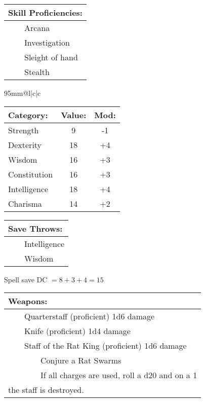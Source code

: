 \documentclass[11pt]{article}
\newcommand{\tabitem}{~~\llap{--}~~}
\newcommand{\tabtabitem}{~~~~~~\llap{$\bullet$}~~}
\begin{document}
\begin{multicols}{2}
\vspace{2mm}
		
\noindent \begin{tabularx}{95mm}{@{}l}
{\Large \textbf{Skill Proficiencies:}} \\
\hline
\tabitem Arcana \\
\tabitem Investigation \\
\tabitem Sleight of hand \\
\tabitem Stealth
		\end{tabularx}

\vspace{4mm}

\noindent \begin{tabularx}{95mm}{@{}l|c|c}
 \\
\hline
		\end{tabularx}
\noindent \begin{tabular}{@{}l|c|c}
\textbf{Category:} 			& \textbf{Value:} 	& \textbf{Mod:} \\
\hline
Strength 					& 9 				& -1 			\\
Dexterity 					& 18 				& +4 			\\
Wisdom 						& 16			 	& +3 			\\
Constitution 				& 16 				& +3 			\\
Intelligence 				& 18 				& +4 			\\
Charisma 					& 14 				& +2
		\end{tabular}

\vspace{4mm}

\noindent \begin{tabularx}{95mm}{@{}l}
{\Large \textbf{Save Throws:}} \\
\hline
\tabitem Intelligence \\
\tabitem Wisdom
		\end{tabularx}
\noindent Spell save DC $= 8 + 3 + 4 = 15$

\vspace{4mm}

\noindent \begin{tabularx}{95mm}{@{}l}
{\Large \textbf{Weapons:}} \\
\hline
\tabitem Quarterstaff (proficient) 1d6 damage \\
\tabitem Knife (proficient) 1d4 damage \\
\tabitem Staff of the Rat King (proficient) 1d6 damage \\
\tabtabitem Conjure a Rat Swarms \\
\tabtabitem If all charges are used, roll a d20 and on a 1 \\ 
the staff is destroyed.
		\end{tabularx}


\end{multicols}
\end{document}
